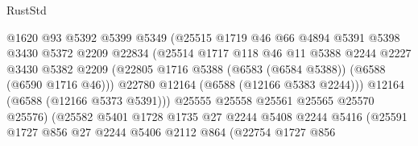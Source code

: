 \begin{lexlean}{RustStd}
\begin{coremodule}
                                @1620
                                @93
                                @5392
                                @5399
                                @5349
                                (@25515
                                  @1719
                                  @46
                                  @66
                                  @4894
                                  @5391
                                  @5398
                                  @3430
                                  @5372
                                  @2209
                                  @22834
                                  (@25514
                                    @1717
                                    @118
                                    @46
                                    @11
                                    @5388
                                    @2244
                                    @2227
                                    @3430
                                    @5382
                                    @2209
                                    (@22805
                                      @1716
                                      @5388
                                      (@6583 (@6584 @5388))
                                      (@6588 (@6590 @1716 @46)))
                                    @22780
                                    @12164
                                    (@6588 (@12166 @5383 @2244)))
                                  @12164
                                  (@6588 (@12166 @5373 @5391)))
                                @25555
                                @25558
                                @25561
                                @25565
                                @25570
                                @25576)
                              (@25582
                                @5401
                                @1728
                                @1735
                                @27
                                @2244
                                @5408
                                @2244
                                @5416
                                (@25591
                                  @1727
                                  @856
                                  @27
                                  @2244
                                  @5406
                                  @2112
                                  @864
                                  (@22754
                                    @1727
                                    @856

\end{coremodule}
\end{lexlean}
